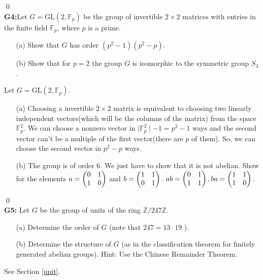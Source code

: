\qed\\
\textbf{G4:}Let $G=\mathrm{GL}\left(2, \mathbb{F}_p\right)$ be the group of invertible $2 \times 2$ matrices with entries in the finite field $\mathbb{F}_p$, where $p$ is a prime.
\begin{itemize}
	\item[(a)] Show that $G$ has order $\left(p^2-1\right)\left(p^2-p\right)$.
	\item[(b)] Show that for $p=2$ the group $G$ is isomorphic to the symmetric group $S_3$.
\end{itemize}
\soln Let $G=\mathrm{GL}\left(2, \mathbb{F}_p\right)$.\\
\begin{itemize}
	\item[(a)] Choosing a invertible $ 2\times2 $ matrix is equivalent to choosing two linearly independent vectors(which will be the columns of the matrix) from the space $ \mathbb{F}_p^2 $. We can choose a nonzero vector in $\mid \mathbb{F}_p^2\mid -1 =  p^2-1 $ ways and the second vector can't be a multiple of the first vector(there are $ p $ of them). So, we can choose the second vector in $ p^2-p $ ways.
	\item[(b)] The group is of order $ 6 $. We just have to show that it is not abelian. Show for the elements $a= \begin{pmatrix} 0 & 1\\ 1 & 0 \end{pmatrix} $ and $b= \begin{pmatrix} 1 & 1\\ 0 & 1 \end{pmatrix} $. $ ab=\begin{pmatrix} 0 & 1\\ 1 & 1 \end{pmatrix}, ba= \begin{pmatrix} 1 & 1\\ 1 & 0 \end{pmatrix}. $
\end{itemize}
\qed\\
\textbf{G5:} Let $G$ be the group of units of the ring $\mathbb{Z} / 247 \mathbb{Z}$.
\begin{itemize}
	\item[(a)] Determine the order of $G$ (note that $247=13 \cdot 19$ ).
	\item[(b)] Determine the structure of $G$ (as in the classification theorem for finitely generated abelian groups). Hint: Use the Chinese Remainder Theorem.
\end{itemize}
\soln See Section \ref{unit}.\\


